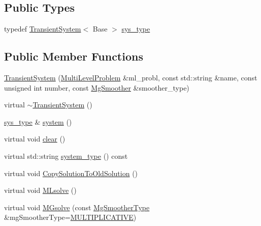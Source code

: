 \subsection*{Public Types}
\begin{DoxyCompactItemize}
\item 
typedef \mbox{\hyperlink{classfemus_1_1_transient_system}{Transient\+System}}$<$ Base $>$ \mbox{\hyperlink{classfemus_1_1_transient_system_ab305e3c2b57ea9f93730f7fc712b6403}{sys\+\_\+type}}
\end{DoxyCompactItemize}
\subsection*{Public Member Functions}
\begin{DoxyCompactItemize}
\item 
\mbox{\hyperlink{classfemus_1_1_transient_system_ab3db35bb6c3a8c97a88d4e8ad9461537}{Transient\+System}} (\mbox{\hyperlink{classfemus_1_1_multi_level_problem}{Multi\+Level\+Problem}} \&ml\+\_\+probl, const std\+::string \&name, const unsigned int number, const \mbox{\hyperlink{_mg_smoother_enum_8hpp_a4d11c2ff93e2f0f440c879a9c40cda71}{Mg\+Smoother}} \&smoother\+\_\+type)
\item 
virtual \mbox{\hyperlink{classfemus_1_1_transient_system_adb4b62a13b1445d7c0a59a73786969c3}{$\sim$\+Transient\+System}} ()
\item 
\mbox{\hyperlink{classfemus_1_1_transient_system_ab305e3c2b57ea9f93730f7fc712b6403}{sys\+\_\+type}} \& \mbox{\hyperlink{classfemus_1_1_transient_system_a2a1e90e75464f42cb981f0dad3038020}{system}} ()
\item 
virtual void \mbox{\hyperlink{classfemus_1_1_transient_system_a2be721088a3cb75315505b89e7469fdf}{clear}} ()
\item 
virtual std\+::string \mbox{\hyperlink{classfemus_1_1_transient_system_a1801793c1013f4be5761dd4a40a69bf1}{system\+\_\+type}} () const
\item 
virtual void \mbox{\hyperlink{classfemus_1_1_transient_system_a6bbd657b80c05844fca4b683c90d879e}{Copy\+Solution\+To\+Old\+Solution}} ()
\item 
virtual void \mbox{\hyperlink{classfemus_1_1_transient_system_a1dbea5bca6437d072d742f94e28e8c24}{M\+Lsolve}} ()
\item 
virtual void \mbox{\hyperlink{classfemus_1_1_transient_system_adea269a19e84a9f6db792b96d159318b}{M\+Gsolve}} (const \mbox{\hyperlink{_mg_type_enum_8hpp_aec11e12c1f11a6ad959d3280ae0ee9a8}{Mg\+Smoother\+Type}} \&mg\+Smoother\+Type=\mbox{\hyperlink{_mg_type_enum_8hpp_aec11e12c1f11a6ad959d3280ae0ee9a8a2618be531dddb3647be5874ddcae5164}{M\+U\+L\+T\+I\+P\+L\+I\+C\+A\+T\+I\+VE}})

\end{DoxyCompactItemize}
